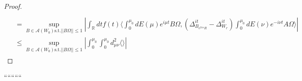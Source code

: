 \documentclass[a4paper,11pt]{article}
\theoremstyle{definition}
\newcommand{\lb}{\left(}
\newcommand{\rb}{\right)}
\begin{document}
{{\begin{proof}
\begin{align}
\begin{split}
            \\&
            =\sup_{B\in\mathcal{A}(W_0)\text{s.t.}||B\Omega||\leq 1}|\int_\mathbb{R} dt f(t)\langle \int_0^{\mu_0}dE(\mu)e^{i\mu t} B\Omega, \lb\Delta^{it}_{B_{e^{2\pi s}R}} - \Delta^{it}_{W_r}\rb\int_0^{\mu_0}dE(\nu)e^{-i\nu t}A\Omega\rangle|
            \\&
            \leq\sup_{B\in\mathcal{A}(W_0)\text{s.t.}||B\Omega||\leq 1}|\int_0^{\mu_0}\int_0^{\mu_0}d^2_{\mu\nu}\langle\rangle\textbf{}|
        \end{split}
    \end{align}
\end{proof}
}
}

``````````

\end{document}
